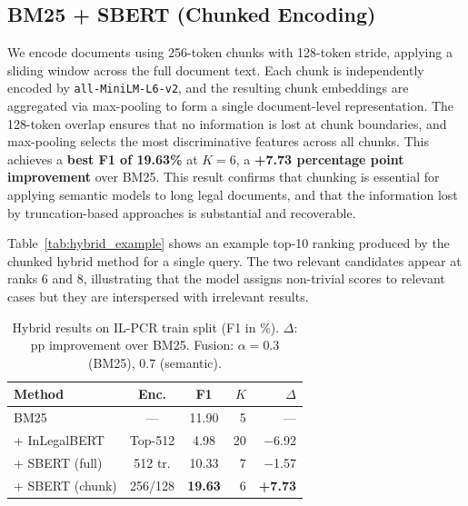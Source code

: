 \documentclass[11pt]{article}
\begin{document}
\subsection{BM25 + SBERT (Chunked Encoding)}
We encode documents using 256-token chunks with 128-token stride, applying a sliding window across the full document text.
Each chunk is independently encoded by \texttt{all-MiniLM-L6-v2}, and the resulting chunk embeddings are aggregated via max-pooling to form a single document-level representation.
The 128-token overlap ensures that no information is lost at chunk boundaries, and max-pooling selects the most discriminative features across all chunks.
This achieves a \textbf{best F1 of 19.63\%} at $K{=}6$, a \textbf{+7.73 percentage point improvement} over BM25.
This result confirms that chunking is essential for applying semantic models to long legal documents, and that the information lost by truncation-based approaches is substantial and recoverable.

Table~\ref{tab:hybrid_example} shows an example top-10 ranking produced by the chunked hybrid method for a single query.
The two relevant candidates appear at ranks 6 and 8, illustrating that the model assigns non-trivial scores to relevant cases but they are interspersed with irrelevant results.

\begin{table}[htbp]
\centering
\footnotesize
\setlength{\tabcolsep}{3pt}
\begin{tabular}{@{}lccrr@{}}
\toprule
\textbf{Method} & \textbf{Enc.} & \textbf{F1} & \textbf{$K$} & \textbf{$\Delta$} \\
\midrule
BM25              & ---       & 11.90 & 5  & --- \\
+ InLegalBERT     & Top-512   & 4.98  & 20 & $-$6.92 \\
+ SBERT (full)    & 512 tr.   & 10.33 & 7  & $-$1.57 \\
+ SBERT (chunk)   & 256/128   & \textbf{19.63} & 6  & \textbf{+7.73} \\
\bottomrule
\end{tabular}
\caption{Hybrid results on IL-PCR train split (F1 in \%). $\Delta$: pp improvement over BM25. Fusion: $\alpha{=}0.3$ (BM25), $0.7$ (semantic).}
\label{tab:hybrid}
\end{table}
\end{document}
